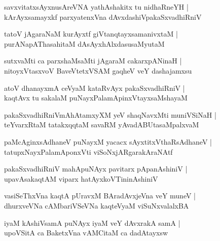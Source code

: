 \documentclass[twoside,12pt,openright]{book}
\newcounter{shloka}[chapter]
\begin{document}
\begin{shloka}%
savxvitatxsAyxnusAreVNA yathAshakitx tu nidhaRneYH |\\
kArAyxsamayxkf parxyatenxVna dAvxdashiVpakaSxvadhiRniV
\end{shloka}

\begin{shloka}%
tatoV jAgaraNaM kurAyxtf giVtanqtayxsamanivxtaM |\\
purANapAThasahitaM dAsAyxhAlxdasusaMyutaM
\end{shloka}

\begin{shloka}%
sutxvaMti ca parxshaMsaMti jAgaraM cakarxpANinaH |\\
nitoyxVtasxvoV BaveVtetxVSAM gaqheV veY dashajamxsu 
\end{shloka}

\begin{shloka}%
atoV dhanayxmA ceVyaM kataRvAyx pakaSxvadhiRniV |\\
kaqtAvx tu sakalaM puNayxPalamApinxVtayxsaMshayaM 
\end{shloka}

\begin{shloka}%
pakaSxvadhiRniVmAhAtamxyXM yeV shaqNavxMti muniVSiNaH |\\
teYvarxRtaM tatakxqqtaM savaRM yAvadABUtasaMpalxvaM 
\end{shloka}

\begin{shloka}%
paMcAginxsAdhaneV puNayxM yacacx sAyxtitxVthaRsAdhaneV |\\
tatupxNayxPalamAponxVti viSoNxjARgarakAraNAtf
\end{shloka}

\begin{shloka}%
pakaSxvadhiRniV mahApuNAyx pavitarx pApanAshiniV |\\
upavAsakaqtAM viparx hatAyxkoVTininAshiniV
\end{shloka}

\begin{shloka}%
vasiSeThxVna kaqtA pUravxM BAradAvxjeVna veY muneV |\\
dhurxveVNa cAMbariVSeVNa kaqteVyaM viSuNxvalalxBA
\end{shloka}

\begin{shloka}%
iyaM kAshiVsamA puNAyx iyaM veY dAvxrakA samA |\\
upoVSitA ca BaketxVna vAMCitaM ca dadAtayxsw
\end{shloka}
\end{document}
